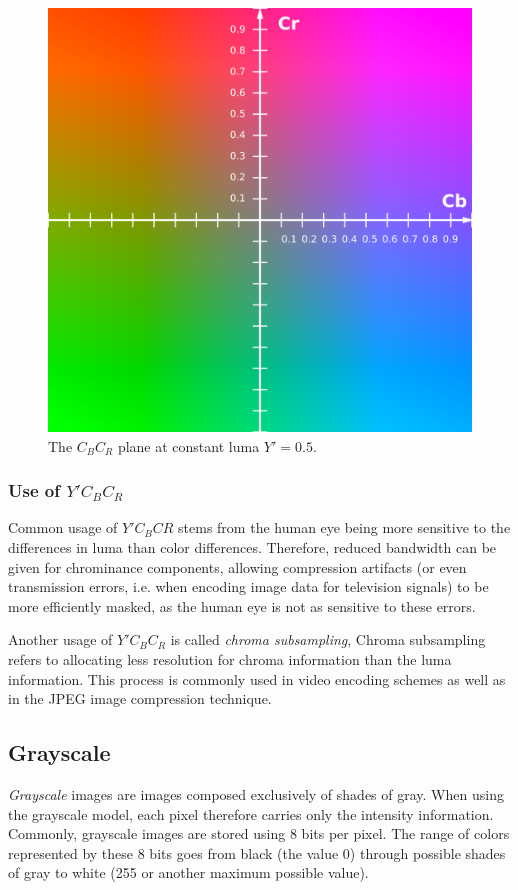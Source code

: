 \documentclass[thesis=M,english]{FITthesis}[2012/10/20]
\begin{document}
\begin{figure}[h]
  \centering
  \includegraphics[scale=0.3]{imgs/ycbcr_plane}
  \caption{The $C_BC_R$ plane at constant luma $Y' = 0.5$.}
  \label{fig:ycbcr_plane}
\end{figure}

\subsubsection{Use of $Y'C_{B}C_{R}$}
Common usage of $Y'C_{B}C{R}$ stems from the human eye being more sensitive to the
differences in luma than color differences. Therefore, reduced bandwidth can be
given for chrominance components, allowing compression artifacts (or even transmission
errors, i.e. when encoding image data for television signals) to be more efficiently
masked, as the human eye is not as sensitive to these errors.

Another usage of $Y'C_BC_R$ is called \emph{chroma subsampling}, Chroma subsampling
refers to allocating less resolution for chroma information than the luma information.
This process is commonly used in video encoding schemes as well as in the JPEG
image compression technique.\cite{img:chroma-subsample}

\subsection{Grayscale}
\emph{Grayscale} images are images composed exclusively of shades of gray.
When using the grayscale model, each pixel therefore carries only the intensity
information. Commonly, grayscale images are stored using 8 bits per pixel.
The range of colors represented by these 8 bits goes from black (the value 0)
through possible shades of gray to white (255 or another maximum possible value).
\end{document}
